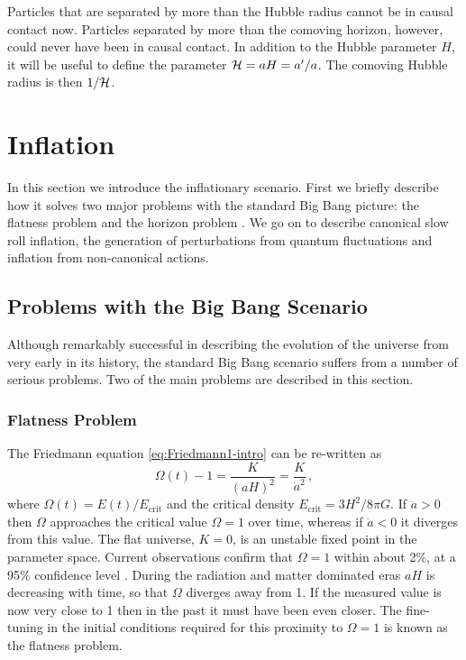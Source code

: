 Particles
that are separated by more than the Hubble radius cannot be in causal
contact now. Particles separated by more than the
comoving horizon, however, could never have been in causal contact. In addition
to the Hubble parameter $H$, it will be useful
to define the parameter $\mathcal{H} = aH = a'/a$. The comoving Hubble radius is then
$1/\mathcal{H}$.







\section{Inflation}
\label{sec:inflation-intro}
In this section we introduce the inflationary scenario. First we briefly
describe how it solves two major problems with the standard Big Bang
picture: the flatness problem and the horizon problem \cite{book:liddle}. We go on to
describe canonical slow roll inflation, the generation of
perturbations from quantum fluctuations and inflation from non-canonical
actions.

\subsection{Problems with the Big Bang Scenario}
Although remarkably successful in describing the evolution of the universe from
very early in its history, the standard Big Bang scenario suffers from a number
of serious problems. Two of the main problems are described in this section.

\subsubsection{Flatness Problem} 
\label{sec:flatprob}
The Friedmann equation
\eqref{eq:Friedmann1-intro} can be re-written as
% 
\begin{equation}
\label{eq:omegadefn-intro}
\Omega(t) - 1 = \frac{K}{(aH)^2} = \frac{K}{\dot{a}^2} \,,
\end{equation}
% 
where $\Omega(t)=E(t)/E_\mathrm{crit}$ and the critical density
$E_\mathrm{crit}= 3H^2/8\pi G$. 
If $\ddot{a}>0$ then $\Omega$ approaches the critical value $\Omega=1$ over time,
whereas if
$\ddot{a}<0$ it diverges from this value. The flat universe, $K=0$,
is an unstable fixed point in the parameter space.
Current observations confirm that $\Omega=1$ within about 2\%, at a 95\% confidence
level \cite{Komatsu:2008hk}.
During the radiation and matter dominated eras $aH$ is decreasing with time,
so that $\Omega$ diverges away from 1. If the measured value is now very
close to 1 then in the past it must have been even closer. 
The fine-tuning in the initial conditions required for this proximity to $\Omega=1$
is known as the flatness problem. 


